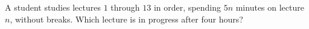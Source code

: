 A student studies lectures $1$ through $13$ in order, spending $5n$ minutes on lecture $n$, without breaks. Which lecture is in progress after four hours?

